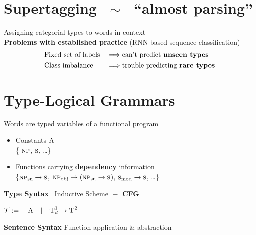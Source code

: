 \documentclass[a0paper,fleqn]{betterposter}
\begin{document}
{
\section{Supertagging $\;\sim\;$ ``almost parsing''}
Assigning categorial types to words in context \\

{\bf Problems with established practice} (RNN-based sequence classification)
\begin{align*}
    &\text{Fixed set of labels} & \implies & \text{can't predict \textbf{unseen types}}\\
    &\text{Class imbalance} & \implies & \text{trouble predicting \textbf{rare types}}\\
\end{align*}

\section{Type-Logical Grammars}
Words are typed variables of a functional program
\begin{itemize}
    \item Constants $\textsc{A}$\\
    \{ $\textsc{np}$, $\textsc{s}$, \dots \}
    \item Functions carrying {\bf dependency} information \\
    \{$\textsc{np}_\text{su}\to\textsc{s}$, $\textsc{np}_\text{obj} \to (\textsc{np}_\text{su} \to \textsc{s}$), $\textsc{s}_\text{mod} \to \textsc{s}$, \dots\}
\end{itemize}

\vspace{1em}

\textbf{Type Syntax} ~Inductive Scheme $\equiv$ \textbf{CFG} 
\begin{center}
     $\mathcal{T} := \quad \textsc{A} \quad | \quad \textsc{T}_d^1 \to \textsc{T}^2$
\end{center}

\textbf{Sentence Syntax} Function application \& abstraction

\vspace{1em}

{}

\vspace{1em}

}
\end{document}
